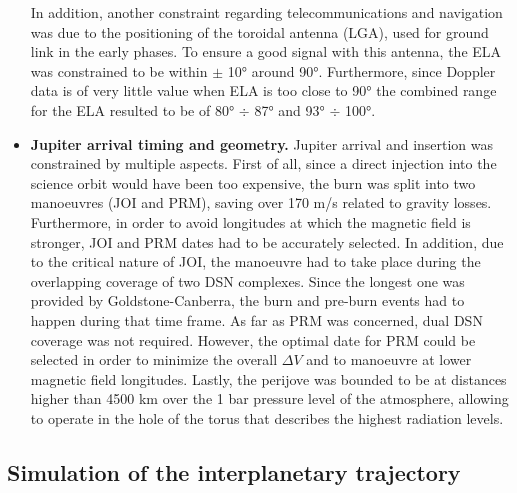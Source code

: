 \begin{itemize}
    In addition, another constraint regarding telecommunications and navigation was due to the positioning of the toroidal antenna (LGA), used for ground link in the early phases.
    To ensure a good signal with this antenna, the ELA was constrained to be within $\pm$ 10° around 90°. Furthermore, since Doppler data is of very little value when ELA is too close to 90° the combined range for the ELA resulted to be of 80° $\div$ 87° and 93° $\div$ 100°.
    \item \textbf{Jupiter arrival timing and geometry.} Jupiter arrival and insertion was constrained by multiple aspects. First of all, since a direct injection into the science orbit would have been too expensive, the burn was split into two manoeuvres (JOI and PRM), saving over 170 m/s \cite{launch_period} related to gravity losses. Furthermore, in order to avoid longitudes at which the magnetic field is stronger, JOI and PRM dates had to be accurately selected. In addition, due to the critical nature of JOI, the manoeuvre had to take place during the overlapping coverage of two DSN complexes. Since the longest one was provided by Goldstone-Canberra, the burn and pre-burn events had to happen during that time frame. As far as PRM was concerned, dual DSN coverage was not required. However, the optimal date for PRM could be selected in order to minimize the overall $\Delta V$ and to manoeuvre at lower magnetic field longitudes. Lastly, the perijove was bounded to be at distances higher than 4500 km over the 1 bar pressure level of the atmosphere, allowing to operate in the hole of the torus that describes the highest radiation levels.
\end{itemize}

\subsection{Simulation of the interplanetary trajectory}
\label{subsec:simulation_interplanetary_trajectory}

